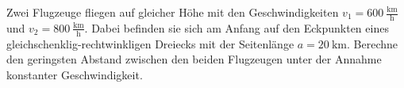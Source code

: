 \begin{Exercise}[title = Flugzeuge, origin = Jaan Kalda]
	Zwei Flugzeuge fliegen auf gleicher Höhe mit den Geschwindigkeiten $v_1 = 600~\mathrm{\frac{km}{h}}$ und $v_2 = 800~\mathrm{\frac{km}{h}}$. Dabei befinden sie sich am Anfang auf den Eckpunkten eines gleichschenklig-rechtwinkligen Dreiecks mit der Seitenlänge $a = 20~\mathrm{km}$. Berechne den geringsten Abstand zwischen den beiden Flugzeugen unter der Annahme konstanter Geschwindigkeit.
\end{Exercise}


